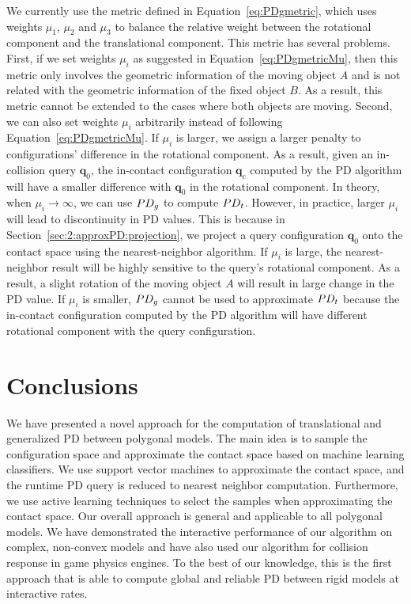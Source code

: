 We currently use the metric defined in Equation~\ref{eq:PDgmetric}, which uses weights $\mu_1$, $\mu_2$ and $\mu_3$ to balance the relative weight between the rotational component and the translational component. This metric has several problems. First, if we set weights $\mu_i$ as suggested in Equation~\ref{eq:PDgmetricMu}, then this metric only involves the geometric information of the moving object $A$ and is not related with the geometric information of the fixed object $B$. As a result, this metric cannot be extended to the cases where both objects are moving. Second, we can also set weights $\mu_i$ arbitrarily instead of following Equation~\ref{eq:PDgmetricMu}. If $\mu_i$ is larger, we assign a larger penalty to configurations' difference in the rotational component. As a result, given an in-collision query $\mathbf q_0$, the in-contact configuration $\mathbf q_c$ computed by the PD algorithm will have a smaller difference with $\mathbf q_0$ in the rotational component. In theory, when $\mu_i \rightarrow \infty$, we can use $PD_g$ to compute $PD_t$. However, in practice, larger $\mu_i$ will lead to discontinuity in PD values. This is because in Section~\ref{sec:2:approxPD:projection}, we project a query configuration $\mathbf q_0$ onto the contact space using the nearest-neighbor algorithm. If $\mu_i$ is large, the nearest-neighbor result will be highly sensitive to the query's rotational component. As a result, a slight rotation of the moving object $A$ will result in large change in the PD value. If $\mu_i$ is smaller, $PD_g$ cannot be used to approximate $PD_t$ because the in-contact configuration computed by the PD algorithm will have different rotational component with the query configuration.




\section{Conclusions}
We have presented a novel approach for the computation of translational and generalized PD between polygonal models.
The main idea is to sample the configuration space and approximate the contact space based on
machine learning classifiers. We use support vector machines to approximate the contact space, and
the runtime PD query is reduced to nearest neighbor computation. Furthermore,
we use active learning techniques to select the samples when approximating the contact space.
Our overall approach is general and applicable to all polygonal models.
We have demonstrated the interactive performance of our algorithm on complex, non-convex models and have also used
our algorithm for collision response in game physics engines.
To the best of our knowledge, this is the first approach that is able to compute global and reliable PD between rigid models at
interactive rates.


